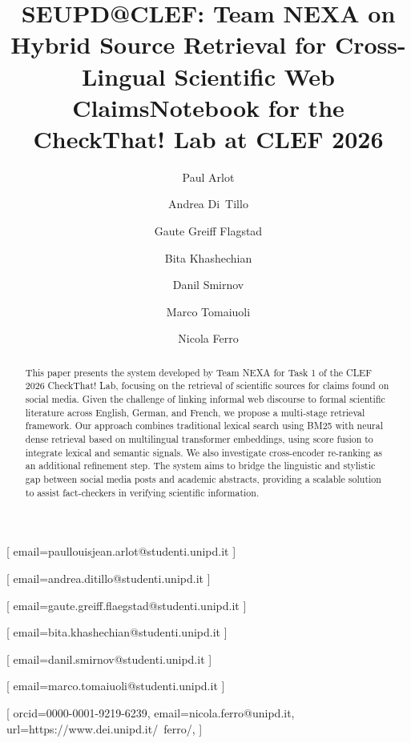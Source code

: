 \documentclass{ceurart}
\begin{document}


\title{SEUPD@CLEF: Team NEXA on Hybrid Source Retrieval for Cross-Lingual Scientific Web Claims}
\title[mode=sub]{Notebook for the CheckThat! Lab at CLEF 2026}

\author[1]{Paul Arlot}[
  email=paullouisjean.arlot@studenti.unipd.it
]

\author[1]{Andrea Di~Tillo}[
  email=andrea.ditillo@studenti.unipd.it
]

\author[1]{Gaute Greiff Flagstad}[
  email=gaute.greiff.flaegstad@studenti.unipd.it
]

\author[1]{Bita Khashechian}[
  email=bita.khashechian@studenti.unipd.it
]

\author[1]{Danil Smirnov}[
  email=danil.smirnov@studenti.unipd.it
]

\author[1]{Marco Tomaiuoli}[
  email=marco.tomaiuoli@studenti.unipd.it
]

\author[1]{Nicola Ferro}[%
orcid=0000-0001-9219-6239,
email=nicola.ferro@unipd.it,
url=https://www.dei.unipd.it/~ferro/,
]


\address[1]{University of Padua, Italy}


\begin{abstract}
This paper presents the system developed by Team NEXA for Task 1 of the CLEF 2026 CheckThat! Lab, focusing on the retrieval of scientific sources for claims found on social media. Given the challenge of linking informal web discourse to formal scientific literature across English, German, and French, we propose a multi-stage retrieval framework. Our approach combines traditional lexical search using BM25 with neural dense retrieval based on multilingual transformer embeddings, using score fusion to integrate lexical and semantic signals. We also investigate cross-encoder re-ranking as an additional refinement step. The system aims to bridge the linguistic and stylistic gap between social media posts and academic abstracts, providing a scalable solution to assist fact-checkers in verifying scientific information.
\end{abstract}
\end{document}

